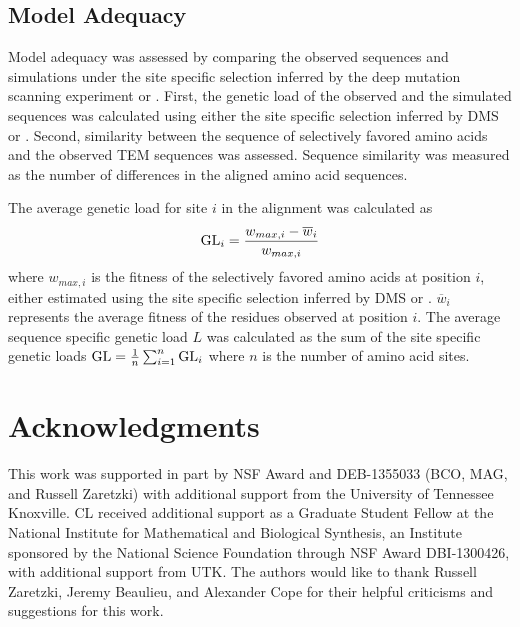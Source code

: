 \documentclass[fleqn,letterpaper]{article}
\newcommand\suppl{\par
  \setcounter{section}{0}%
  \setcounter{subsection}{0}%
  \setcounter{table}{0}%
  \setcounter{figure}{0}%
  \setcounter{equation}{0}%
  \gdef\thesection{\Alph{section}.1}%
  \def\thefigure{\Alph{section}\arabic{figure}}%
  \def\thetable{\Alph{section}\arabic{table}}%
  \def\theequation {\Alph{section}\arabic{equation}}}
\begin{document}
\subsection{Model Adequacy}

Model adequacy was assessed by comparing the observed sequences and simulations under the site specific selection inferred by the deep mutation scanning experiment or \selac.
First, the genetic load of the observed and the simulated sequences was calculated using either the site specific selection inferred by DMS or \selac.
Second, similarity between the sequence of selectively favored amino acids and the observed TEM sequences was assessed.
Sequence similarity was measured as the number of differences in the aligned amino acid sequences.

The average genetic load for site $i$ in the alignment was calculated as
\begin{equation}
\text{GL}_i = \frac{w_{max,i} - \overline{w}_i}{w_{max,i}}
\end{equation}
where $w_{max,i}$ is the fitness of the selectively favored amino acids at position $i$, either estimated using the site specific selection inferred by DMS or \selac.
$\overline{w}_i$ represents the average fitness of the residues observed at position $i$.
The average sequence specific genetic load $L$ was calculated as the sum of the site specific genetic loads $\text{GL} = \frac{1}{n}\sum_{i=1}^n \text{GL}_i$ where $n$ is the number of amino acid sites.

\section{Acknowledgments}
This work was supported in part by NSF Award and DEB-1355033 (BCO, MAG, and Russell Zaretzki) with additional support from the University of Tennessee Knoxville. 
CL received additional support as a Graduate Student Fellow at the National Institute for Mathematical and Biological Synthesis, an Institute sponsored by the National Science Foundation through NSF Award DBI-1300426, with additional support from UTK. 
The authors would like to thank Russell Zaretzki, Jeremy Beaulieu, and Alexander Cope for their helpful criticisms and suggestions for this work.


 

\clearpage


\suppl
\setcounter{section}{18} %
\setcounter{page}{1}
\renewcommand{\thepage}{S\arabic{page}} %
\end{document}
